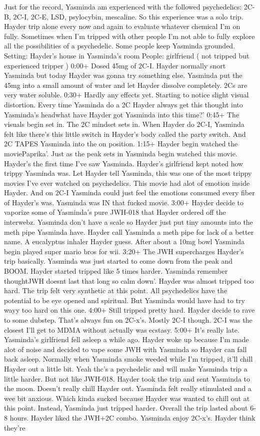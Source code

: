 \documentclass[12pt]{book}
\begin{document}
Just for the record, Yasminda am experienced with the followed psychedelics: 2C-B, 2C-I, 2C-E, LSD, psylocybin, mescaline. So this experience was a solo trip. Hayder trip alone every now and again to evaluate whatever chemical I'm on fully. Sometimes when I'm tripped with other people I'm not able to fully explore all the possibilities of a psychedelic. Some people keep Yasminda grounded. Setting: Hayder's house in Yasminda's room People: girlfriend ( not tripped but experienced tripper ) 0:00+ Dosed 45mg of 2C-I. Hayder normally snort Yasminda but today Hayder was gonna try something else. Yasminda put the 45mg into a small amount of water and let Hayder dissolve completely. 2Cs are very water soluble. 0:30+ Hardly any effects yet. Starting to notice slight visual distortion. Every time Yasminda do a 2C Hayder always get this thought into Yasminda's headwhat have Hayder got Yasminda into this time?' 0:45+ The visuals begin set in. The 2C mindset sets in. When Hayder do 2C-I, Yasminda felt like there's this little switch in Hayder's body called the party switch. And 2C TAPES Yasminda into the on position. 1:15+ Hayder begin watched the moviePaprika'. Just as the peak sets in Yasminda begin watched this movie. Hayder's the first time I've saw Yasminda. Hayder's girlfriend kept noted how trippy Yasminda was. Let Hayder tell Yasminda, this was one of the most trippy movies I've ever watched on psychedelics. This movie had alot of emotion inside Hayder. And on 2C-I Yasminda could just feel the emotions consumed every fiber of Hayder's was. Yasminda was IN that fucked movie. 3:00+ Hayder decide to vaporize some of Yasminda's pure JWH-018 that Hayder ordered off the interwebz. Yasminda don't have a scale so Hayder just put tiny amounts into the meth pipe Yasminda have. Hayder call Yasminda a meth pipe for lack of a better name. A eucalyptus inhaler Hayder guess. After about a 10mg bowl Yasminda begin played super mario bros for wii. 3:20+ The JWH supercharges Hayder's trip basically. Yasminda was just started to come down from the peak and BOOM. Hayder started tripped like 5 times harder. Yasminda remember thoughtJWH doesnt last that long so calm down'. Hayder was almost tripped too hard. The trip felt very synthetic at this point. All psychedelics have the potential to be eye opened and spiritual. But Yasminda would have had to try wayy too hard on this one. 4:00+ Still tripped pretty hard. Hayder decide to rave to some dubstep. That's always fun on 2C-x's. Mostly 2C-I though. 2C-I was the closest I'll get to MDMA without actually was ecstasy. 5:00+ It's really late. Yasminda's girlfriend fell asleep a while ago. Hayder woke up because I'm made alot of noise and decided to vape some JWH with Yasminda so Hayder can fall back asleep. Normally when Yasminda smoke weeded while I'm tripped, it'll chill Hayder out a little bit. Yeah thc's a psychedelic and will make Yasminda trip a little harder. But not like JWH-018. Hayder took the trip and sent Yasminda to the moon. Doesn't really chill Hayder out. Yasminda felt really stimulated and a wee bit anxious. Which kinda sucked because Hayder was wanted to chill out at this point. Instead, Yasminda just tripped harder. Overall the trip lasted about 6-8 hours. Hayder liked the JWH+2C combo. Yasminda enjoy 2C-x's. Hayder think they're 
\end{document}
